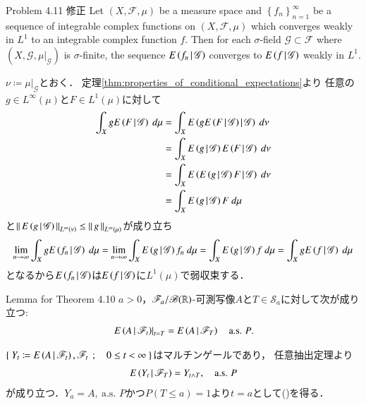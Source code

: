 	\begin{itembox}[l]{Problem 4.11 修正}
		Let $(X,\mathscr{F},\mu)$ be a measure space and  
		$\left\{f_n\right\}_{n=1}^\infty$ be a sequence of integrable complex functions on $(X,\mathscr{F},\mu)$
		which converges weakly in $L^1$ to an integrable complex function $f$.
		Then for each $\sigma$-field $\mathscr{G} \subset \mathscr{F}$
		where $(X,\mathscr{G},\left.\mu\right|_{\mathscr{G}})$ is $\sigma$-finite,
		the sequence $E\left( f_n \, \middle|\, \mathscr{G} \right)$ converges to $E\left( f \, \middle|\, \mathscr{G} \right)$ weakly in $L^1$.
	\end{itembox}
	
	\begin{prf}
		$\nu \coloneqq \left.\mu\right|_{\mathscr{G}}$とおく．
		定理\ref{thm:properties_of_conditional_expectations}より
		任意の$g \in L^\infty(\mu)$と$F \in L^1(\mu)$に対して
		\begin{align}
			\int_X g\cexp{F}{\mathscr{G}}\ d\mu
			&= \int_X \cexp{g\cexp{F}{\mathscr{G}}}{\mathscr{G}}\ d\nu \\
			&= \int_X \cexp{g}{\mathscr{G}}\cexp{F}{\mathscr{G}}\ d\nu \\
			&= \int_X \cexp{\cexp{g}{\mathscr{G}}F}{\mathscr{G}}\ d\nu \\
			&= \int_X \cexp{g}{\mathscr{G}}F\ d\mu
		\end{align}
		と$\left\|\, E\left( g \, \middle|\, \mathscr{G} \right)\, \right\|_{L^\infty(\nu)} \leq \left\|\, g\, \right\|_{L^\infty(\mu)}$が成り立ち
		\begin{align}
			\lim_{n \to \infty} \int_X gE\left( f_n \, \middle|\, \mathscr{G} \right)\ d\mu
			= \lim_{n \to \infty} \int_X E\left( g \, \middle|\, \mathscr{G} \right)f_n\ d\mu
			= \int_X E\left( g \, \middle|\, \mathscr{G} \right)f\ d\mu
			= \int_X gE\left( f \, \middle|\, \mathscr{G} \right)\ d\mu
		\end{align}
		となるから$E\left( f_n \, \middle|\, \mathscr{G} \right)$は$E\left( f \, \middle|\, \mathscr{G} \right)$に$L^1(\mu)$で弱収束する．
		\QED
	\end{prf}
	
	\begin{itembox}[l]{Lemma for Theorem 4.10}
		$a > 0$，$\mathscr{F}_a/\mathscr{B}(\mathbb{R})$-可測写像$A$と$T \in \mathscr{S}_a$に対して次が成り立つ:
		\begin{align}
			\left. E\left( A \, \middle|\, \mathscr{F}_t \right) \right|_{t = T} = E\left( A \, \middle|\, \mathscr{F}_T \right)
			\quad \mbox{a.s. $P$}.
			\label{eq:lemma_for_theorem_4_10}
		\end{align}
	\end{itembox}
	
	\begin{prf}
		$\left\{\ Y_t \coloneqq E\left( A \, \middle|\, \mathscr{F}_t \right),\mathscr{F}_t\ \, ; \quad 0 \leq t < \infty\ \right\}$はマルチンゲールであり，
		任意抽出定理より
		\begin{align}
			E\left( Y_t \, \middle|\, \mathscr{F}_T \right) = Y_{t \wedge T},
			\quad \mbox{a.s. $P$}
		\end{align}
		が成り立つ．$Y_a = A,\ \mbox{a.s. $P$}$かつ$P(T \leq a)=1$より$t=a$として()を得る．
		\QED
	\end{prf}
	
